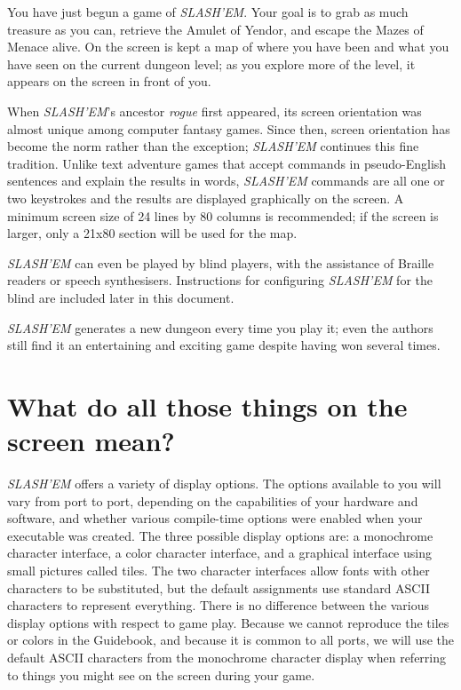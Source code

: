 
You have just begun a game of {\it SLASH'EM}.  Your goal is to grab as much
treasure as you can, retrieve the Amulet of Yendor, and escape the
Mazes of Menace alive.  On the screen is kept a map of where you have
been and what you have seen on the current dungeon level; as you
explore more of the level, it appears on the screen in front of you.

When {\it SLASH'EM\/}'s ancestor {\it rogue\/} first appeared, its screen
orientation was almost unique among computer fantasy games.  Since
then, screen orientation has become the norm rather than the
exception; {\it SLASH'EM\/} continues this fine tradition.  Unlike text
adventure games that accept commands in pseudo-English sentences and
explain the results in words, {\it SLASH'EM\/} commands are all one or two
keystrokes and the results are displayed graphically on the screen.  A
minimum screen size of 24 lines by 80 columns is recommended; if the
screen is larger, only a 21x80 section will be used for the map.

{\it SLASH'EM\/} can even be played by blind players, with the assistance of Braille
readers or speech synthesisers.  Instructions for configuring {\it SLASH'EM\/} for
the blind are included later in this document.

{\it SLASH'EM\/} generates a new dungeon every time you play it; even the
authors still find it an entertaining and exciting game despite
having won several times.

\section{What do all those things on the screen mean?}


{\it SLASH'EM\/} offers a variety of display options.  The options available to you
will vary from port to port, depending on the capabilities of your
hardware and software, and whether various compile-time options were
enabled when your executable was created.  The three possible display
options are: a monochrome character interface, a color character interface,
and a graphical interface using small pictures called tiles.  The two
character interfaces allow fonts with other characters to be substituted,
but the default assignments use standard ASCII characters to represent
everything.  There is no difference between the various display options
with respect to game play.  Because we cannot reproduce the tiles or
colors in the Guidebook, and because it is common to all ports, we will
use the default ASCII characters from the monochrome character display
when referring to things you might see on the screen during your game.

